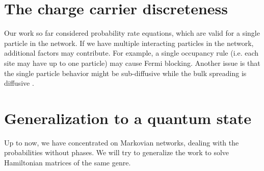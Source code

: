 \section{The charge carrier discreteness}\label{sec:discreteness}

Our work so far considered probability rate equations, which are valid for a single particle in the network.
If we have multiple interacting particles in the network, additional factors may contribute. For example,
a single occupancy rule (i.e. each site may have up to one particle) may cause Fermi blocking. Another
issue is that the single particle behavior might be sub-diffusive while the bulk spreading is diffusive \cite{richards_theory_1977,hung_diffusion_2012}.


\section{Generalization to a quantum state}

Up to now, we have concentrated on Markovian networks, dealing with the probabilities without phases.
We will try to generalize the work to solve Hamiltonian matrices of the same genre.







